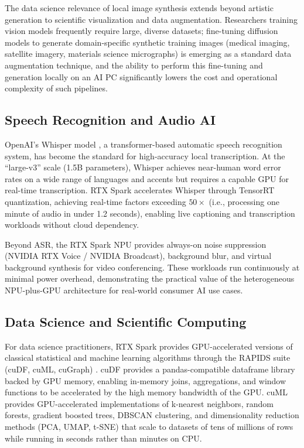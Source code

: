 \documentclass[conference]{IEEEtran}
\begin{document}
The data science relevance of local image synthesis extends beyond artistic generation to scientific visualization and data augmentation. Researchers training vision models frequently require large, diverse datasets; fine-tuning diffusion models to generate domain-specific synthetic training images (medical imaging, satellite imagery, materials science micrographs) is emerging as a standard data augmentation technique, and the ability to perform this fine-tuning and generation locally on an AI PC significantly lowers the cost and operational complexity of such pipelines.

\subsection{Speech Recognition and Audio AI}

OpenAI's Whisper model \cite{radford2022whisper}, a transformer-based automatic speech recognition system, has become the standard for high-accuracy local transcription. At the ``large-v3'' scale (1.5B parameters), Whisper achieves near-human word error rates on a wide range of languages and accents but requires a capable GPU for real-time transcription. RTX Spark accelerates Whisper through TensorRT quantization, achieving real-time factors exceeding $50\times$ (i.e., processing one minute of audio in under 1.2 seconds), enabling live captioning and transcription workloads without cloud dependency.

Beyond ASR, the RTX Spark NPU provides always-on noise suppression (NVIDIA RTX Voice / NVIDIA Broadcast), background blur, and virtual background synthesis for video conferencing. These workloads run continuously at minimal power overhead, demonstrating the practical value of the heterogeneous NPU-plus-GPU architecture for real-world consumer AI use cases.

\subsection{Data Science and Scientific Computing}

For data science practitioners, RTX Spark provides GPU-accelerated versions of classical statistical and machine learning algorithms through the RAPIDS suite (cuDF, cuML, cuGraph) \cite{rapidsai2019}. cuDF provides a pandas-compatible dataframe library backed by GPU memory, enabling in-memory joins, aggregations, and window functions to be accelerated by the high memory bandwidth of the GPU. cuML provides GPU-accelerated implementations of k-nearest neighbors, random forests, gradient boosted trees, DBSCAN clustering, and dimensionality reduction methods (PCA, UMAP, t-SNE) that scale to datasets of tens of millions of rows while running in seconds rather than minutes on CPU.
\end{document}
